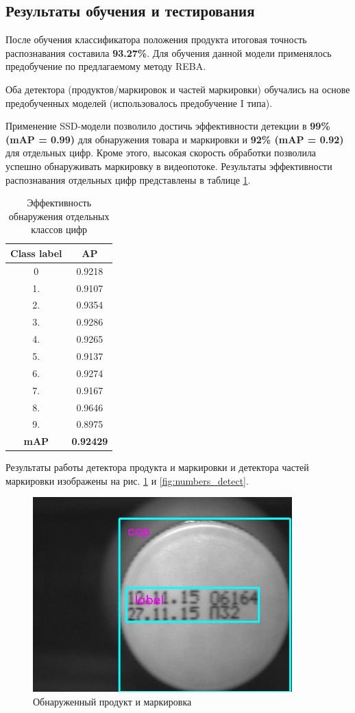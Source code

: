 \subsection{Результаты обучения и тестирования} 
После обучения классификатора положения продукта итоговая точность распознавания составила \textbf{93.27\%}. Для обучения данной модели применялось предобучение по предлагаемому методу REBA.

Оба детектора (продуктов/маркировок и частей маркировки) обучались на основе предобученных моделей (использовалось предобучение I типа).

Применение SSD-модели позволило достичь эффективности детекции в \textbf{99\% (mAP = 0.99)} для обнаружения товара и маркировки и \textbf{92\% (mAP = 0.92)} для отдельных цифр. Кроме этого, высокая скорость обработки позволила успешно обнаруживать маркировку в видеопотоке. Результаты эффективности распознавания отдельных цифр представлены в таблице \ref{tab:efficiency_detector1}.  

\begin{table}[h]
\caption{Эффективность обнаружения отдельных классов цифр}
\centering
\begin{tabular}{ | c | c |  }
\hline
Class label & AP \\ \hline
0 & 0.9218\\
1. & 0.9107\\
2. & 0.9354\\
3. & 0.9286\\
4. & 0.9265\\
5. & 0.9137\\
6. & 0.9274\\
7. & 0.9167\\
8. & 0.9646\\
9. & 0.8975\\
\hline
\textbf{mAP} & \textbf{0.92429}\\
\hline
\end{tabular}
\label{tab:efficiency_detector1}
\end{table}

Результаты работы детектора продукта и маркировки и детектора частей маркировки изображены на рис. \ref{fig:product_detect}  и \ref{fig:numbers_detect}.

\begin{figure}[!ht]
	\centering
	\includegraphics[width=10cm]{man-source/images/ch4/pic4-25.png}
	\caption{Обнаруженный продукт и маркировка}
	\label{fig:product_detect}
\end{figure}

